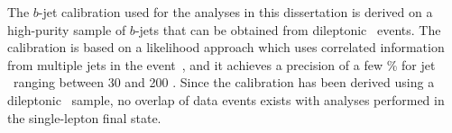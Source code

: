 %

The $b$-jet calibration used for the analyses in this dissertation is derived on a high-purity sample of $b$-jets that can be obtained from dileptonic \ttbar\ events.
The calibration is based on a likelihood approach which uses correlated information from multiple jets in the event~\cite{BTagSF}, and 
it achieves a precision of a few \% for jet \pT\ ranging between 30 and 200 \GeV. 
Since the calibration has been derived using a dileptonic \ttbar\ sample, no overlap of data events 
exists with analyses performed in the single-lepton final state.

